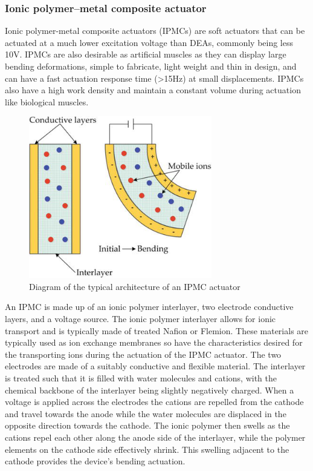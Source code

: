 \subsubsection{Ionic polymer–metal composite actuator}
Ionic polymer-metal composite actuators (IPMCs) are soft actuators that can be actuated at a much lower excitation voltage than DEAs, commonly being less 10V. IPMCs are also desirable as artificial muscles as they can display large bending deformations, simple to fabricate, light weight and thin in design, and can have a fast actuation response time (>15Hz) at small displacements\citep{Ma2020}. IPMCs also have a high work density and maintain a constant volume during actuation like biological muscles.
\begin{figure}[h!]
  \centering
  \includegraphics[width=8cm]{Figures/IPMC.png}
  \caption{Diagram of the typical architecture of an IPMC actuator\citep{Yanjie2018}}
  \label{fig:Artificial Muscle}
\end{figure}
An IPMC is made up of an ionic polymer interlayer, two electrode conductive layers, and a voltage source. The ionic polymer interlayer allows for ionic transport and is typically made of treated Nafion or Flemion. These materials are typically used as ion exchange membranes so have the characteristics desired for the transporting ions during the actuation of the IPMC actuator. The two electrodes are made of a suitably conductive and flexible material. The interlayer is treated such that it is filled with water molecules and cations, with the chemical backbone of the interlayer being slightly negatively charged. When a voltage is applied across the electrodes the cations are repelled from the cathode and travel towards the anode while the water molecules are displaced in the opposite direction towards the cathode. The ionic polymer then swells as the cations repel each other along the anode side of the interlayer, while the polymer elements on the cathode side effectively shrink\citep{Segalman1999}. This swelling adjacent to the cathode provides the device's bending actuation.

